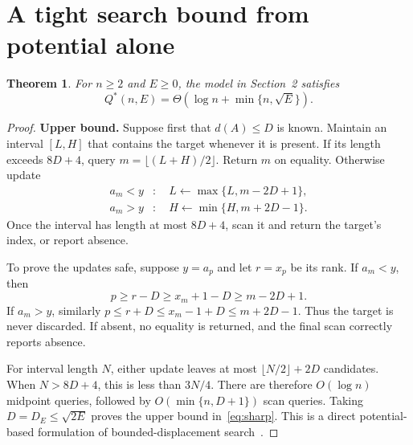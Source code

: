 \documentclass[10pt,letterpaper]{article}
\newtheorem{theorem}{Theorem}
\begin{document}
\newpage
\section{A tight search bound from potential alone}
\begin{theorem}\label{thm:sharp}
For $n\geq2$ and $E\geq0$, the model in Section~2 satisfies
\begin{equation}
 \boxed{Q^*(n,E)=\Theta\!\left(\log n+\min\{n,\sqrt E\}\right).}
 \label{eq:sharp}
\end{equation}
\end{theorem}
\begin{proof}
\textbf{Upper bound.} Suppose first that $d(A)\leq D$ is known. Maintain an interval
$[L,H]$ that contains the target whenever it is present. If its length exceeds
$8D+4$, query $m=\lfloor(L+H)/2\rfloor$. Return $m$ on equality. Otherwise update
\begin{equation}
\begin{aligned}
 a_m<y &: \quad L\leftarrow\max\{L,m-2D+1\},\\
 a_m>y &: \quad H\leftarrow\min\{H,m+2D-1\}.
\end{aligned} \label{eq:updates}
\end{equation}
Once the interval has length at most $8D+4$, scan it and return the target's index,
or report absence.

To prove the updates safe, suppose $y=a_p$ and let $r=x_p$ be its rank.
If $a_m<y$, then
\begin{equation}
 p\geq r-D\geq x_m+1-D\geq m-2D+1.
 \label{eq:saferight}
\end{equation}
If $a_m>y$, similarly $p\leq r+D\leq x_m-1+D\leq m+2D-1$.
Thus the target is never discarded. If absent, no equality is returned, and the final
scan correctly reports absence.

For interval length $N$, either update leaves at most
$\lfloor N/2\rfloor+2D$ candidates. When $N>8D+4$, this is less than $3N/4$.
There are therefore $O(\log n)$ midpoint queries, followed by
$O(\min\{n,D+1\})$ scan queries. Taking $D=D_E\leq\sqrt{2E}$ proves the upper
bound in~\eqref{eq:sharp}. This is a direct potential-based formulation of
bounded-displacement search~\cite{disser}.


\end{proof}
\end{document}

